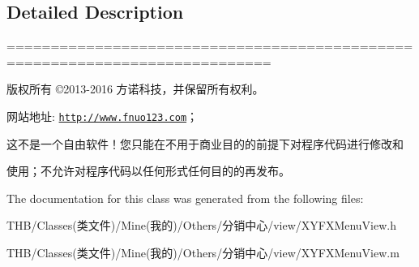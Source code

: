 \subsection{Detailed Description}
============================================================================

版权所有 ©2013-\/2016 方诺科技，并保留所有权利。

网站地址\+: \href{http://www.fnuo123.com}{\tt http\+://www.\+fnuo123.\+com}； 



这不是一个自由软件！您只能在不用于商业目的的前提下对程序代码进行修改和

使用；不允许对程序代码以任何形式任何目的的再发布。 

 

The documentation for this class was generated from the following files\+:\begin{DoxyCompactItemize}
\item 
T\+H\+B/\+Classes(类文件)/\+Mine(我的)/\+Others/分销中心/view/X\+Y\+F\+X\+Menu\+View.\+h\item 
T\+H\+B/\+Classes(类文件)/\+Mine(我的)/\+Others/分销中心/view/X\+Y\+F\+X\+Menu\+View.\+m\end{DoxyCompactItemize}

